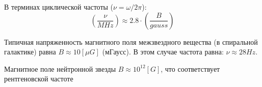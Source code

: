 \documentclass[a4paper,12pt]{extarticle}
\begin{document}
    В терминах циклической частоты ($\nu = \omega/2\pi$):
    \[
        \left(\frac{\nu}{MHz}\right) \approx 2.8 \cdot \left(\frac{B}{gauss}\right)
    \]
 
    Типичная напряженность магнитного поля межзвездного вещества (в спиральной галактике) равна $B \approx 10 [\mu G]$ (мГаусс).
    В этом случае частота равна: $\nu \approx 28 Hz$. 

    Магнитное поле нейтронной звезды
    $B \approx 10^{12} [G]$, что соответствует рентгеновской частоте
\clearpage
\sloppy
\printbibliography
\end{document}
